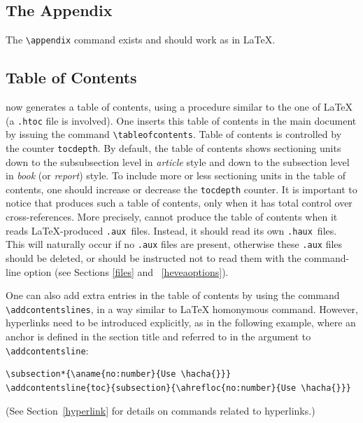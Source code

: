 \subsection{The \label{appendix}Appendix}
The \verb+\appendix+ command exists and should work as in \LaTeX.

\subsection{Table of Contents}
%
%
\hevea{} now generates a table of contents, using a procedure similar
to the one of \LaTeX
(a \texttt{.htoc} file is involved).
One inserts this table of contents in the main document by issuing
the command \verb+\tableofcontents+.
Table of contents is controlled by the counter  \verb+tocdepth+.
By default, the table of contents shows sectioning units down to the
subsubsection level in \textit{article} style and down to the subsection level
in \textit{book} (or \textit{report}) style. To include more or less
sectioning units in the
table of contents, one should increase or decrease the \verb+tocdepth+
counter.
It is important to notice that \hevea{} produces such a table of
contents, only when it has total control over cross-references.
More precisely, \hevea{} cannot produce the table of contents when it
reads \LaTeX{}-produced \texttt{.aux}~files.
Instead, it should read its own \texttt{.haux}~files.
This will naturally occur if no \texttt{.aux} files are present,
otherwise these \texttt{.aux} files should be deleted, or \hevea{}
should be instructed not to read them with the command-line option
(see Sections \ref{files} and ~\ref{heveaoptions}).

One can also add extra entries in the table of contents by using
the command \verb+\addcontentslines+, in a way similar
to \LaTeX{} homonymous command.
However, hyperlinks need to be introduced explicitly,
as in the following example, where
an anchor is defined in the section title and referred to in the
argument to \verb+\addcontentsline+:
\begin{verbatim}
\subsection*{\aname{no:number}{Use \hacha{}}}
\addcontentsline{toc}{subsection}{\ahrefloc{no:number}{Use \hacha{}}}
\end{verbatim}
(See Section~\ref{hyperlink} for details on commands related to hyperlinks.)

